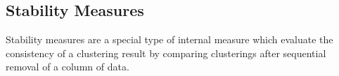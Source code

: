 \subsection{Stability Measures}
Stability measures  are a
special type of  internal measure which evaluate the  consistency of a
clustering result by comparing clusterings after sequential removal of
a column of data.








